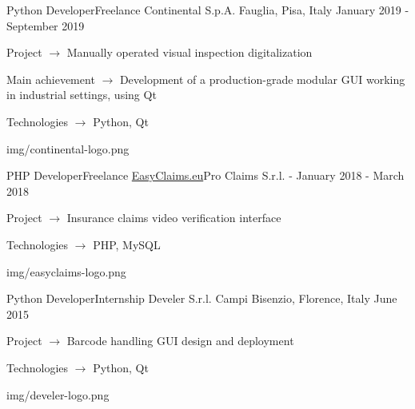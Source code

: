 \begin{cventries}
  \logocventry
    {Python Developer{\enskip\cdotp\enskip}Freelance}
    {Continental S.p.A.}
    {Fauglia, Pisa, Italy}
    {January 2019 - September 2019}
    {
      \begin{cvitems}
        \item {Project $\rightarrow$ Manually operated visual inspection digitalization}
        \item {Main achievement $\rightarrow$ Development of a production-grade modular GUI working in industrial settings, using Qt}
        \item {Technologies $\rightarrow$ Python, Qt}
      \end{cvitems}
    }
    {img/continental-logo.png}

  \logocventry
    {PHP Developer{\enskip\cdotp\enskip}Freelance}
    {\href{https://www.easyclaims.eu}{EasyClaims.eu}{\enskip\cdotp\enskip}Pro Claims S.r.l.}
    {-}
    {January 2018 - March 2018}
    {
      \begin{cvitems}
        \item {Project $\rightarrow$ Insurance claims video verification interface}
        \item {Technologies $\rightarrow$ PHP, MySQL}
      \end{cvitems}
    }
    {img/easyclaims-logo.png}

  \logocventry
    {Python Developer{\enskip\cdotp\enskip}Internship}
    {Develer S.r.l.}
    {Campi Bisenzio, Florence, Italy}
    {June 2015}
    {
      \begin{cvitems}
        \item {Project $\rightarrow$ Barcode handling GUI design and deployment}
        \item {Technologies $\rightarrow$ Python, Qt}
      \end{cvitems}
    }
    {img/develer-logo.png}

\end{cventries}
